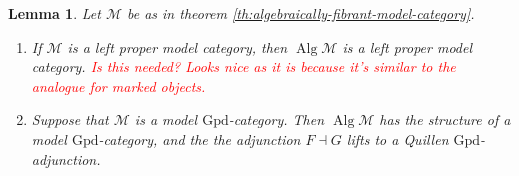 \documentclass{article}
\newcommand{\todo}[1]{\textcolor{red}{#1}}
\newtheorem{lemma}{Lemma}
\theoremstyle{remark}
\theoremstyle{definition}
\begin{document}
\begin{lemma}
  \label{lem:algebraically-fibrant-lproper-simplicial}
  Let $\mathcal{M}$ be as in theorem \ref{th:algebraically-fibrant-model-category}.
  \begin{enumerate}
    \item
      \label{itm:algebraic-left-proper}
      If $\mathcal{M}$ is a left proper model category, then $\operatorname{Alg} \mathcal{M}$ is a left proper model category.
      \todo{Is this needed? Looks nice as it is because it's similar to the analogue for marked objects.}
    \item
      \label{itm:algebraic-simplicial}
      Suppose that $\mathcal{M}$ is a model $\mathrm{Gpd}$-category.
      Then $\operatorname{Alg} \mathcal{M}$ has the structure of a model $\mathrm{Gpd}$-category, and the the adjunction $F \dashv G$ lifts to a Quillen $\mathrm{Gpd}$-adjunction.
  \end{enumerate}
\end{lemma}
\end{document}
